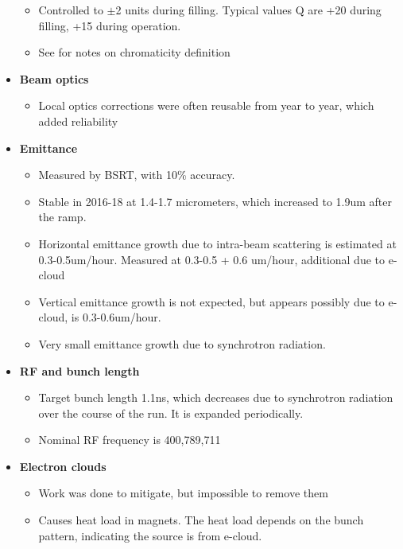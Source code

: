 \begin{itemize}
\begin{itemize}
        \item Controlled to $\pm$2 units during filling. Typical values Q are +20 during filling, +15 during operation. \cite{lhcRun2}
        \item See \cite{fuchsberger} for notes on chromaticity definition \cite{lhcRun2}
    \end{itemize}
    \item \textbf{Beam optics} \cite{lhcRun2}
    \begin{itemize}
        \item Local optics corrections were often reusable from year to year, which added reliability \cite{lhcRun2}
    \end{itemize}
    \item \textbf{Emittance} \cite{lhcRun2}
    \begin{itemize}
        \item Measured by BSRT, with 10\% accuracy. \cite{lhcRun2}
        \item Stable in 2016-18 at 1.4-1.7 micrometers, which increased to 1.9um after the ramp. \cite{lhcRun2}
        \item Horizontal emittance growth due to intra-beam scattering is estimated at 0.3-0.5um/hour. Measured at 0.3-0.5 + 0.6 um/hour, additional due to e-cloud \cite{lhcRun2}
        \item Vertical emittance growth is not expected, but appears possibly due to e-cloud, is 0.3-0.6um/hour. \cite{lhcRun2}
        \item Very small emittance growth due to synchrotron radiation. \cite{lhcRun2}
    \end{itemize}
    \item \textbf{RF and bunch length} \cite{lhcRun2}
    \begin{itemize}
        \item Target bunch length 1.1ns, which decreases due to synchrotron radiation over the course of the run. It is expanded periodically. \cite{lhcRun2}
        \item Nominal RF frequency is 400,789,711 \cite{lhcRun2}
    \end{itemize}
    \item \textbf{Electron clouds} \cite{lhcRun2}
    \begin{itemize}
        \item Work was done to mitigate, but impossible to remove them \cite{lhcRun2}
        \item Causes heat load in magnets. The heat load depends on the bunch pattern, indicating the source is from e-cloud. \cite{lhcRun2}

\end{itemize}
\end{itemize}
